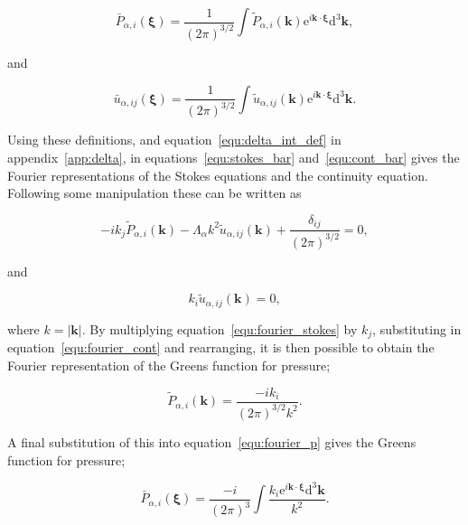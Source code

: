 \documentclass[12pt]{article}
\begin{document}
\begin{equation}
\label{equ:fourier_p}
\bar{P}_{\alpha, i} (\boldsymbol\xi) = \frac{1}{(2 \pi)^{3/2}} \int \tilde{P}_{\alpha, i} (\boldsymbol{k}) \mathrm{e}^{i \boldsymbol{k} \cdot \boldsymbol\xi} \mathrm{d}^{3} \boldsymbol{k} ,
\end{equation}

and 

\begin{equation}
\label{equ:fourier_vel}
\bar{u}_{\alpha,ij} (\boldsymbol\xi) = \frac{1}{(2 \pi)^{3/2}} \int \tilde{u}_{\alpha,ij} (\boldsymbol{k}) \mathrm{e}^{i \boldsymbol{k} \cdot \boldsymbol\xi} \mathrm{d}^{3} \boldsymbol{k} .
\end{equation}


Using these definitions, and equation~\ref{equ:delta_int_def} in appendix~\ref{app:delta}, in equations~\ref{equ:stokes_bar} and~\ref{equ:cont_bar} gives the Fourier representations of the Stokes equations and the continuity equation. Following some manipulation these can be written as

\begin{equation}
\label{equ:fourier_stokes}
-i k_{j} \tilde{P}_{\alpha, i} (\boldsymbol{k}) - \Lambda_{\alpha} k^{2} \tilde{u}_{\alpha,ij} (\boldsymbol{k}) + \frac{\delta_{ij}}{(2 \pi)^{3/2}} = 0 ,
\end{equation}

and 

\begin{equation}
\label{equ:fourier_cont}
k_{i} \tilde{u}_{\alpha,ij} (\boldsymbol{k}) = 0 ,
\end{equation}

where $k = |\boldsymbol{k}|$. By multiplying equation~\ref{equ:fourier_stokes} by $k_{j}$, substituting in equation~\ref{equ:fourier_cont} and rearranging, it is then possible to obtain the Fourier representation of the Greens function for pressure;

\begin{equation}
\label{equ:fourier_green_p}
\tilde{P}_{\alpha, i} (\boldsymbol{k}) = \frac{-i k_{i}}{(2 \pi)^{3/2} k^{2}}.
\end{equation}

A final substitution of this into equation~\ref{equ:fourier_p} gives the Greens function for pressure;

\begin{equation}
\label{equ:green_p_int}
\bar{P}_{\alpha, i} (\boldsymbol\xi) = \frac{-i}{(2 \pi)^{3}} \int \frac{k_{i} \mathrm{e}^{i \boldsymbol{k} \cdot \boldsymbol{\xi}} \mathrm{d}^{3} \boldsymbol{k}}{k^{2}} .
\end{equation}
\end{document}

